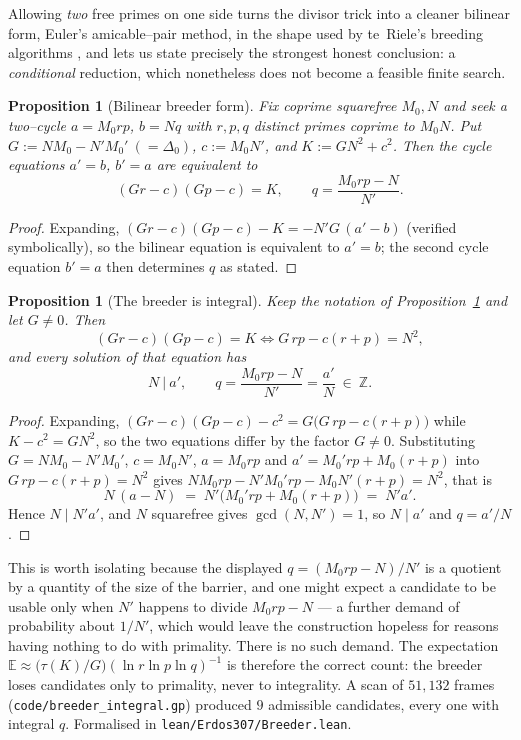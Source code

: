 \documentclass[11pt]{article}
\newtheorem{proposition}[theorem]{Proposition}
\theoremstyle{definition}
\begin{document}
Allowing \emph{two} free primes on one side turns the divisor trick into a cleaner bilinear form,
Euler's amicable--pair method, in the shape used by te~Riele's breeding algorithms
\cite{teRiele1984}, and lets us state precisely the strongest honest conclusion: a
\emph{conditional} reduction, which nonetheless does not become a feasible finite search.

\begin{proposition}[Bilinear breeder form]\label{prop:bde}
Fix coprime squarefree $M_0,N$ and seek a two--cycle $a=M_0rp$, $b=Nq$ with $r,p,q$ distinct primes
coprime to $M_0N$. Put $G:=NM_0-N'M_0'\ (=\Delta_0)$, $c:=M_0N'$, and $K:=GN^2+c^2$. Then the cycle
equations $a'=b$, $b'=a$ are equivalent to
\[
(Gr-c)(Gp-c)=K, \qquad q=\frac{M_0rp-N}{N'}.
\]
\end{proposition}
\begin{proof}
Expanding, $(Gr-c)(Gp-c)-K=-N'G\,(a'-b)$ (verified symbolically), so the bilinear equation is
equivalent to $a'=b$; the second cycle equation $b'=a$ then determines $q$ as stated.
\end{proof}

\begin{proposition}[The breeder is integral]\label{prop:bdeint}
Keep the notation of Proposition~\textup{\ref{prop:bde}} and let $G\ne0$. Then
\[ (Gr-c)(Gp-c)=K \iff G\,rp-c(r+p)=N^{2}, \]
and every solution of that equation has
\[ N\ \big|\ a', \qquad q=\frac{M_0rp-N}{N'}=\frac{a'}{N}\ \in\ \mathbb{Z}. \]
\end{proposition}
\begin{proof}
Expanding, $(Gr-c)(Gp-c)-c^{2}=G\bigl(G\,rp-c(r+p)\bigr)$ while $K-c^{2}=GN^{2}$, so the two
equations differ by the factor $G\ne0$. Substituting $G=NM_0-N'M_0'$, $c=M_0N'$, $a=M_0rp$ and
$a'=M_0'rp+M_0(r+p)$ into $G\,rp-c(r+p)=N^{2}$ gives
$NM_0rp-N'M_0'rp-M_0N'(r+p)=N^{2}$, that is
\[ N\,(a-N)\;=\;N'\bigl(M_0'rp+M_0(r+p)\bigr)\;=\;N'a'. \]
Hence $N\mid N'a'$, and $N$ squarefree gives $\gcd(N,N')=1$, so $N\mid a'$ and $q=a'/N$.
\end{proof}

This is worth isolating because the displayed $q=(M_0rp-N)/N'$ is a quotient by a quantity of the
size of the barrier, and one might expect a candidate to be usable only when $N'$ happens to divide
$M_0rp-N$ --- a further demand of probability about $1/N'$, which would leave the construction
hopeless for reasons having nothing to do with primality. There is no such demand. The expectation
$\mathbb{E}\approx\bigl(\tau(K)/G\bigr)(\ln r\ln p\ln q)^{-1}$ is therefore the correct count: the
breeder loses candidates only to primality, never to integrality. A scan of $51{,}132$ frames
(\texttt{code/breeder\_integral.gp}) produced $9$ admissible candidates, every one with integral $q$.
Formalised in \texttt{lean/Erdos307/Breeder.lean}.
\end{document}
